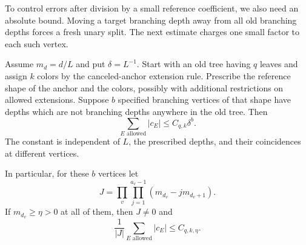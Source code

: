 To control errors after division by a small reference coefficient, we
also need an absolute bound.  Moving a target branching depth away from
all old branching depths forces a fresh unary split.  The next estimate
charges one small factor to each such vertex.

\begin{lemma}\label{tree:charging}
Assume $m_d=d/L$ and put $\delta=L^{-1}$.  Start with an old tree having
$q$ leaves and assign $k$ colors by the canceled-anchor extension
rule.  Prescribe the reference shape of the anchor and the colors,
possibly with additional restrictions on allowed extensions.  Suppose
$b$ specified branching vertices of that shape have depths which
are not branching depths anywhere in the old tree.  Then
\begin{equation}\label{tree:charging-bound}
   \sum_{E\text{ allowed}}|c_E|\leq C_{q,k}\delta^b.
\end{equation}
The constant is independent of $L$, the prescribed depths, and their
coincidences at different vertices.

In particular, for these $b$ vertices let
\[
 J=\prod_v\prod_{j=1}^{a_v-1}(m_{d_v}-jm_{d_v+1}).
\]
If $m_{d_v}\geq\eta>0$ at all of them, then $J\ne0$ and
\begin{equation}\label{tree:relative-charging}
   \frac{1}{|J|}\sum_{E\text{ allowed}}|c_E|
        \leq C_{q,k,\eta}.
\end{equation}
\end{lemma}

